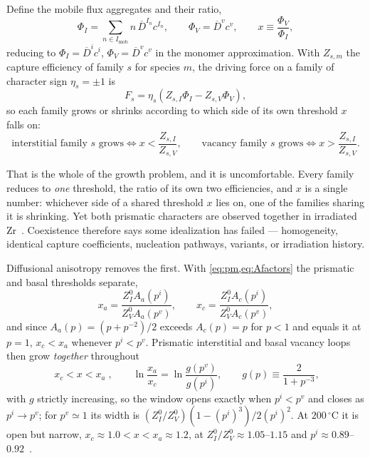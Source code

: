 Define the mobile flux aggregates and their ratio,
\begin{equation}
  \Phi_I=\sum_{n\in I_{\mathrm{mob}}}n\,\overline D^{I_n}c^{I_n},
  \qquad
  \Phi_V=\overline D^{v}c^{v},
  \qquad
  x\equiv\frac{\Phi_V}{\Phi_I},
  \label{eq:fluxscales}
\end{equation}
reducing to $\Phi_I=\overline D^{i}c^{i}$, $\Phi_V=\overline D^{v}c^{v}$ in the
monomer approximation. With $Z_{s,m}$ the capture efficiency of family $s$ for
species $m$, the driving force on a family of character sign $\eta_s=\pm1$ is
\begin{equation}
  F_s=\eta_s\left(Z_{s,I}\Phi_I-Z_{s,V}\Phi_V\right),
  \label{eq:Fsigma}
\end{equation}
so each family grows or shrinks according to which side of its own threshold $x$
falls on:
\begin{equation}
  \text{interstitial family }s\text{ grows}\iff x<\frac{Z_{s,I}}{Z_{s,V}},
  \qquad
  \text{vacancy family }s\text{ grows}\iff x>\frac{Z_{s,I}}{Z_{s,V}} .
  \label{eq:growconds}
\end{equation}

That is the whole of the growth problem, and it is uncomfortable. Every family
reduces to \emph{one} threshold, the ratio of its own two efficiencies, and $x$
is a single number: whichever side of a shared threshold $x$ lies on, one of the
families sharing it is shrinking. Yet both prismatic characters are observed
together in irradiated
Zr~\citep{jostsons1977nature,griffiths1988review,carpenter1981study,%
marchrico2025}. Coexistence therefore says some idealization has failed ---
homogeneity, identical capture coefficients, nucleation pathways, variants, or
irradiation history.

Diffusional anisotropy removes the first. With \cref{eq:pm,eq:Afactors} the
prismatic and basal thresholds separate,
\begin{equation}
  x_a=\frac{Z^{0}_{I}A_a(p^{i})}{Z^{0}_{V}A_a(p^{v})},
  \qquad
  x_c=\frac{Z^{0}_{I}A_c(p^{i})}{Z^{0}_{V}A_c(p^{v})},
  \label{eq:thresholds}
\end{equation}
and since $A_a(p)=(p+p^{-2})/2$ exceeds $A_c(p)=p$ for $p<1$ and equals it at
$p=1$, $x_c<x_a$ whenever $p^{i}<p^{v}$. Prismatic interstitial and basal
vacancy loops then grow \emph{together} throughout
\begin{equation}
  \boxed{\;x_c<x<x_a\;},
  \qquad
  \ln\frac{x_a}{x_c}=\ln\frac{g(p^{v})}{g(p^{i})},
  \qquad
  g(p)\equiv\frac{2}{1+p^{-3}},
  \label{eq:window}
\end{equation}
with $g$ strictly increasing, so the window opens exactly when $p^{i}<p^{v}$ and
closes as $p^{i}\to p^{v}$; for $p^{v}\simeq1$ its width is
$(Z^{0}_{I}/Z^{0}_{V})(1-(p^{i})^{3})/2(p^{i})^{2}$. At $200\,^{\circ}$C it is
open but narrow, $x_c\approx1.0<x<x_a\approx1.2$, at
$Z^{0}_{I}/Z^{0}_{V}\approx1.05$--$1.15$ and
$p^{i}\approx0.89$--$0.92$~\citep{woo1988theory,christien2009cluster,%
barashev2015theoretical,li2020coupled}.

